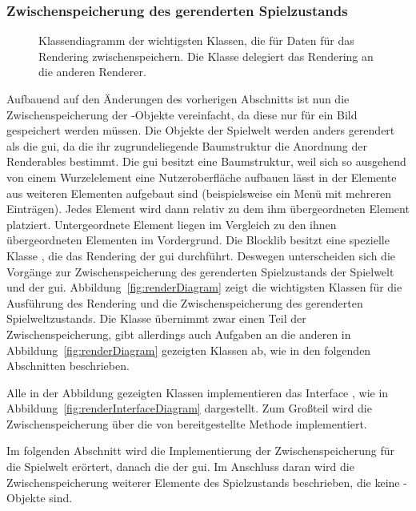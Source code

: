 \subsubsection{Zwischenspeicherung des gerenderten Spielzustands}\label{sec:saveRenderState}
\begin{figure}
	\centering
	
	\caption{Klassendiagramm der wichtigsten Klassen, die für Daten für das Rendering zwischenspeichern. Die Klasse  delegiert das Rendering an die anderen Renderer.}\label{fig:renderDiagram}
\end{figure}
Aufbauend auf den Änderungen des vorherigen Abschnitts ist nun die Zwischenspeicherung der -Objekte vereinfacht, da diese nur für ein Bild gespeichert werden müssen. Die Objekte der Spielwelt werden anders gerendert als die \ac{gui}, da die ihr zugrundeliegende Baumstruktur die Anordnung der Renderables bestimmt. Die \ac{gui} besitzt eine Baumstruktur, weil sich so ausgehend von einem Wurzelelement eine Nutzeroberfläche aufbauen lässt in der Elemente aus weiteren Elementen aufgebaut sind (beispielsweise ein Menü mit mehreren Einträgen). Jedes Element wird dann relativ zu dem ihm übergeordneten Element platziert. Untergeordnete Element liegen im Vergleich zu den ihnen übergeordneten Elementen im Vordergrund. Die Blocklib besitzt eine spezielle Klasse , die das Rendering der \ac{gui} durchführt. Deswegen unterscheiden sich die Vorgänge zur Zwischenspeicherung des gerenderten Spielzustands der Spielwelt und der \ac{gui}. Abbildung~\vref{fig:renderDiagram} zeigt die wichtigsten Klassen für die Ausführung des Rendering und die Zwischenspeicherung des gerenderten Spielweltzustands. Die Klasse  übernimmt zwar einen Teil der Zwischenspeicherung, gibt allerdings auch Aufgaben an die anderen in Abbildung~\vref{fig:renderDiagram} gezeigten Klassen ab, wie in den folgenden Abschnitten beschrieben.

Alle in der Abbildung gezeigten Klassen implementieren das Interface , wie in Abbildung~\vref{fig:renderInterfaceDiagram} dargestellt. Zum Großteil wird die Zwischenspeicherung über die von  bereitgestellte Methode  implementiert.

Im folgenden Abschnitt wird die Implementierung der Zwischenspeicherung für die Spielwelt erörtert, danach die der \ac{gui}. Im Anschluss daran wird die Zwischenspeicherung weiterer Elemente des Spielzustands beschrieben, die keine -Objekte sind.

